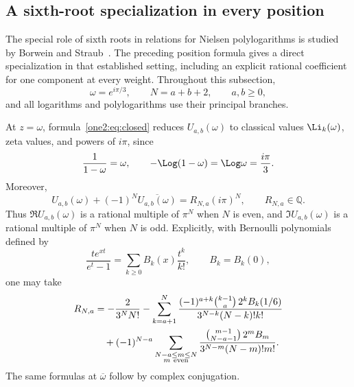 \subsection{A sixth-root specialization in every position}
\label{one2:sec:sixthroot}

The special role of sixth roots in relations for Nielsen polylogarithms
is studied by Borwein and Straub~\cite{BorweinStraub2015}.  The preceding
position formula gives a direct specialization in that established
setting, including an explicit rational coefficient for one component
at every weight.  Throughout this subsection,
\[
 \omega=e^{i\pi/3},\qquad N=a+b+2,\qquad a,b\ge0,
\]
and all logarithms and polylogarithms use their principal branches.

\begin{corollary}
\label{one2:cor:sixthroot}
At $z=\omega$, formula~\eqref{one2:eq:closed} reduces
$U_{a,b}(\omega)$ to classical values $\Li_k(\omega)$, zeta values,
and powers of $i\pi$, since
\begin{equation}
 \frac1{1-\omega}=\omega,\qquad
 -\Log(1-\omega)=\Log\omega=\frac{i\pi}{3}.
 \label{one2:eq:sixthfixed}
\end{equation}
Moreover,
\begin{equation}
 U_{a,b}(\omega)+(-1)^N\overline{U_{a,b}(\omega)}
       =R_{N,a}(i\pi)^N,\qquad R_{N,a}\in\mathbb Q.
 \label{one2:eq:sixthparity}
\end{equation}
Thus $\Re U_{a,b}(\omega)$ is a rational multiple of $\pi^N$
when $N$ is even, and $\Im U_{a,b}(\omega)$ is a rational multiple
of $\pi^N$ when $N$ is odd.  Explicitly, with Bernoulli polynomials
defined by
\[
 \frac{t e^{xt}}{e^t-1}
    =\sum_{k\ge0}B_k(x)\frac{t^k}{k!},\qquad B_k=B_k(0),
\]
one may take
\begin{align}
 R_{N,a}
 &=-\frac{2}{3^N N!}
 -\sum_{k=a+1}^{N}
   \frac{(-1)^{a+k}\binom{k-1}{a}\,2^k B_k(1/6)}
        {3^{N-k}(N-k)!k!}\notag\\
 &\quad+(-1)^{N-a}
   \sum_{\substack{N-a\le m\le N\\m\ \mathrm{even}}}
   \frac{\binom{m-1}{N-a-1}\,2^m B_m}
        {3^{N-m}(N-m)!m!}.
 \label{one2:eq:sixthcoefficient}
\end{align}
The same formulas at $\overline\omega$ follow by complex conjugation.
\end{corollary}

